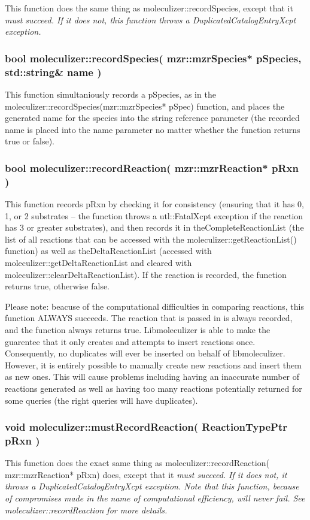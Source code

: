 This function does the same thing as moleculizer::recordSpecies,
except that it \em{must} succeed.  If it does not, this function
throws a DuplicatedCatalogEntryXcpt exception.

\subsubsection{bool moleculizer::recordSpecies( mzr::mzrSpecies*
  pSpecies, std::string\& name )}
This function simultaniously records a pSpecies, as in the
moleculizer::recordSpecies(mzr::mzrSpecies* pSpec) function, and
places the generated name for the species into the string reference
parameter (the recorded name is placed into the name parameter no
matter whether the function returns true or false).

\subsubsection{bool moleculizer::recordReaction( mzr::mzrReaction* pRxn
  )}

This function records pRxn by checking it for consistency (ensuring
that it has 0, 1, or 2 substrates -- the function throws a
utl::FatalXcpt exception if the reaction has 3 or greater substrates),
and then records it in theCompleteReactionList (the list of all
reactions that can be accessed with the moleculizer::getReactionList()
function) as well as theDeltaReactionList (accessed with
moleculizer::getDeltaReactionList and cleared with
moleculizer::clearDeltaReactionList).  If the reaction is recorded,
the function returns true, otherwise false. 

Please note: beacuse of the computational difficulties in comparing
reactions, this function ALWAYS succeeds.  The reaction that is passed
in is always recorded, and the function always returns true.
Libmoleculizer is able to make the guarentee that it only creates and
attempts to insert reactions once.  Consequently, no duplicates will
ever be inserted on behalf of libmoleculizer.  However, it is entirely
possible to manually create new reactions and insert them as new
ones.  This will cause problems including having an inaccurate number
of reactions generated as well as having too many reactions
potentially returned for some queries (the right queries will have duplicates).

\subsubsection{void moleculizer::mustRecordReaction( ReactionTypePtr
  pRxn )}
This function does the exact same thing as
moleculizer::recordReaction( mzr::mzrReaction* pRxn) does, except that
it \em{must} succeed.  If it does not, it throws a
DuplicatedCatalogEntryXcpt exception.  Note that this function,
because of compromises made in the name of computational efficiency,
will never fail.  See moleculizer::recordReaction for more details.  


